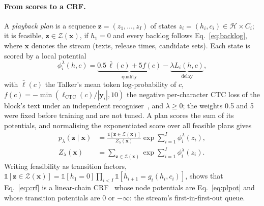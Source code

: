 \paragraph{From scores to a CRF.} A \emph{playback plan} is a sequence $\bm{z}=(z_1,\dots,z_I)$ of states
$z_i=(h_i,c_i)\in\mathcal{H}\times C_i$; it is feasible, $\bm{z}\in\mathcal{Z}(\bm{x})$, if $h_1=0$ and every backlog
follows Eq.~\eqref{eq:backlog}, where $\bm{x}$ denotes the stream (texts, release times, candidate sets). Each state
is scored by a local potential
\begin{equation}
\phi^\lambda_i(h,c)=\underbrace{0.5\,\bar{\ell}(c)+5f(c)}_{\text{quality}}-\underbrace{\lambda L_i(h,c)}_{\text{delay}},
\label{eq:plpot}
\end{equation}
with $\bar{\ell}(c)$ the Talker's mean token log-probability of $c$, $f(c)=-\min(\ell_\text{CTC}(c)/|\bm{y}_i|,10)$ the
negative per-character CTC loss of the block's text under an independent recogniser~\citep{baevski2020wav2vec}, and
$\lambda\ge0$; the weights 0.5 and 5 were fixed before training and are not tuned. A plan scores the sum of its
potentials, and normalising the exponentiated score over all feasible plans gives
\begin{equation}
\begin{aligned}
p_\lambda(\bm{z}\mid\bm{x})&=\frac{\mathds{1}[\bm{z}\in\mathcal{Z}(\bm{x})]}{Z_\lambda(\bm{x})}\exp\sum_{i=1}^{I}\phi^\lambda_i(z_i),\\
Z_\lambda(\bm{x})&=\sum_{\bm{z}\in\mathcal{Z}(\bm{x})}\exp\sum_{i=1}^{I}\phi^\lambda_i(z_i).
\end{aligned}
\label{eq:crf}
\end{equation}
Writing feasibility as transition factors, $\mathds{1}[\bm{z}\in\mathcal{Z}(\bm{x})]=\mathds{1}[h_1=0]\prod_{i<I}\mathds{1}[h_{i+1}=g_i(h_i,c_i)]$,
shows that Eq.~\eqref{eq:crf} is a linear-chain CRF~\citep{lafferty2001crf} whose node potentials are
Eq.~\eqref{eq:plpot} and whose transition potentials are $0$ or $-\infty$: the stream's first-in-first-out queue.

